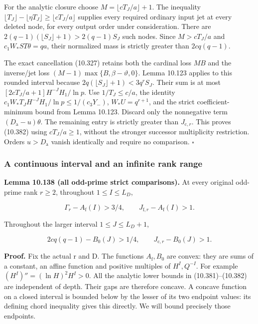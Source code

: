 \documentclass[
  11pt,
  a4paper,
]{article}
\begin{document}
For the analytic closure choose \(M=\lfloor cT_J/a\rfloor+1\). The
inequality
\(\lfloor T_J\rfloor-\lfloor\eta T_J\rfloor\ge\lfloor cT_J/a\rfloor\)
supplies every required ordinary input jet at every deleted node, for
every output order under consideration. There are
\(2(q-1)(\lfloor S_J\rfloor+1)>2(q-1)S_J\) such nodes. Since
\(M>cT_J/a\) and \(c_1W_*ST\theta=qa\), their normalized mass is
strictly greater than \(2cq(q-1)\).

The exact cancellation (10.327) retains both the cardinal loss \(MB\)
and the inverse/jet loss \((M-1)\max\{B,\beta-\vartheta,0\}\). Lemma
10.123 applies to this rounded interval because
\(2q(\lfloor S_J\rfloor+1)<3q^rS_J\). Their sum is at most
\([2cT_J/a+1]H^{-J}H_1/\ln p\). Use \(1/T_J\le c/a\), the identity
\(c_1W_*T_JH^{-J}H_1/\ln p\le1/(c_3Y_-)\), \(W_*U=q^{r+1}\), and the
strict coefficient-minimum bound from Lemma 10.123. Discard only the
nonnegative term \((D_{\mathrm a}-u)\theta\). The remaining entry is
strictly greater than \(J_{\mathrm c,r}\). This proves (10.382) using
\(cT_J/a\ge1\), without the stronger successor multiplicity restriction.
Orders \(u>D_{\mathrm a}\) vanish identically and require no comparison.
\(\square\)

\subsubsection{A continuous interval and an infinite rank
range}\label{a-continuous-interval-and-an-infinite-rank-range}

\textbf{Lemma 10.138 (all odd-prime strict comparisons).} At every
original odd-prime rank \(r\ge2\), throughout \(1\le I\le L_D\),

\[
\Gamma_r-A_{\mathrm f}(I)>3/4,\qquad
J_{\mathrm f,r}-A_{\mathrm f}(I)>1.
\tag{10.383}
\]

Throughout the larger interval \(1\le J\le L_D+1\),

\[
2cq(q-1)-B_0(J)>1/4,\qquad
J_{\mathrm c,r}-B_0(J)>1.
\tag{10.384}
\]

\textbf{Proof.} Fix the actual r and D. The functions
\(A_{\mathrm f},B_0\) are convex: they are sums of a constant, an affine
function and positive multiples of \(H^I,Q^{-I}\). For example
\((H^I)''=(\ln H)^2H^I>0\). All the analytic lower bounds in
(10.381)--(10.382) are independent of depth. Their gaps are therefore
concave. A concave function on a closed interval is bounded below by the
lesser of its two endpoint values: its defining chord inequality gives
this directly. We will bound precisely those endpoints.
\end{document}
